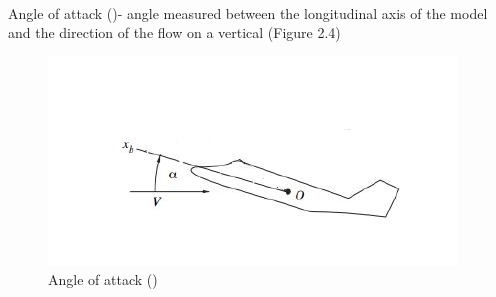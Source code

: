 \paragraph{}Angle of attack (\textalpha)- angle measured between the longitudinal axis of the model and the direction of the flow on a vertical (Figure 2.4)
\begin{center}
	\begin{figure}[!h]
	\centering
	\includegraphics{Figures/Fig10}
	\caption{Angle of attack (\textalpha)}
	\end{figure}
\end{center}